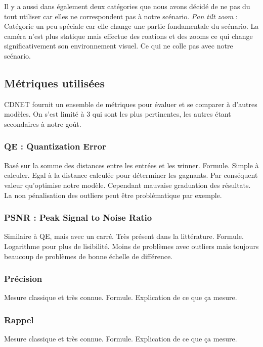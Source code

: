 	
	Il y a aussi dans également deux catégories que nous avons décidé de ne pas du tout utiliser car elles ne correspondent pas à notre scénario. \textit{Pan tilt zoom} : Catégorie un peu spéciale car elle change une partie fondamentale du scénario. La caméra n'est plus statique mais effectue des roations et des zooms ce qui change significativement son environnement visuel. Ce qui ne colle pas avec notre scénario.

	\subsection{Métriques utilisées}

	CDNET fournit un ensemble de métriques pour évaluer et se comparer à d'autres modèles. On s'est limité à 3 qui sont les plus pertinentes, les autres étant secondaires à notre goût.

	\subsubsection{QE : Quantization Error}

	Basé sur la somme des distances entre les entrées et les winner. Formule. Simple à calculer. Egal à la distance calculée pour déterminer les gagnants. Par conséquent valeur qu'optimise notre modèle. Cependant mauvaise graduation des résultats. La non pénalisation des outliers peut être problématique par exemple.

	\subsubsection{PSNR : Peak Signal to Noise Ratio}

	Similaire à QE, mais avec un carré. Très présent dans la littérature. Formule. Logarithme pour plus de lisibilité. Moins de problèmes avec outliers mais toujours beaucoup de problèmes de bonne échelle de différence.

	\subsubsection{Précision}

	Mesure classique et très connue. Formule. Explication de ce que ça mesure.

	\subsubsection{Rappel}

	Mesure classique et très connue. Formule. Explication de ce que ça mesure.

